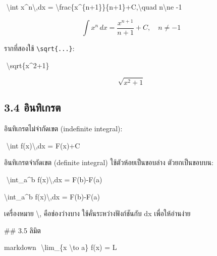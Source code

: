 \documentclass[
  thai,
  12pt,
  letterpaper,
  DIV=11,
  numbers=noendperiod]{scrartcl}
\newenvironment{Shaded}{\begin{snugshade}}{\end{snugshade}}
\newcommand{\FunctionTok}[1]{\textcolor[rgb]{0.28,0.35,0.67}{#1}}
\newcommand{\InformationTok}[1]{\textcolor[rgb]{0.37,0.37,0.37}{#1}}
\newcommand{\NormalTok}[1]{\textcolor[rgb]{0.00,0.23,0.31}{#1}}
\begin{document}
\begin{Shaded}
\begin{Highlighting}[]
\NormalTok{$$}
\NormalTok{\textbackslash{}int x\^{}n\textbackslash{},dx = \textbackslash{}frac\{x\^{}\{n+1\}\}\{n+1\}+C,\textbackslash{}quad n\textbackslash{}ne {-}1}
\NormalTok{$$}
\end{Highlighting}
\end{Shaded}

\[
\int x^n\,dx = \frac{x^{n+1}}{n+1}+C,\quad n\ne -1
\]

รากที่สองใช้ \texttt{\textbackslash{}sqrt\{...\}}:

\begin{Shaded}
\begin{Highlighting}[]
\NormalTok{$$}
\NormalTok{\textbackslash{}sqrt\{x\^{}2+1\}}
\NormalTok{$$}
\end{Highlighting}
\end{Shaded}

\[
\sqrt{x^2+1}
\]

\subsection{3.4 อินทิเกรต}\label{uxe2duxe19uxe17uxe40uxe01uxe23uxe15}

อินทิเกรตไม่จำกัดเขต (indefinite integral):

\begin{Shaded}
\begin{Highlighting}[]
\NormalTok{$$}
\NormalTok{\textbackslash{}int f(x)\textbackslash{},dx = F(x)+C}
\NormalTok{$$}
\end{Highlighting}
\end{Shaded}

อินทิเกรตจำกัดเขต (definite integral) ใช้ตัวห้อยเป็นขอบล่าง ตัวยกเป็นขอบบน:

\begin{Shaded}
\begin{Highlighting}[]
\NormalTok{$$}
\NormalTok{\textbackslash{}int\_a\^{}b f(x)\textbackslash{},dx = F(b){-}F(a)}
\NormalTok{$$}
\NormalTok{$$}

\NormalTok{\textbackslash{}int\_a\^{}b f(x)\textbackslash{},dx = F(b){-}F(a)}
\NormalTok{$$}

\NormalTok{เครื่องหมาย }\InformationTok{\textasciigrave{}\textbackslash{},\textasciigrave{}}\NormalTok{ คือช่องว่างบาง ใช้คั่นระหว่างฟังก์ชันกับ }\InformationTok{\textasciigrave{}dx\textasciigrave{}}\NormalTok{ เพื่อให้อ่านง่าย}

\FunctionTok{\#\# 3.5 ลิมิต}

\InformationTok{\textasciigrave{}\textasciigrave{}\textasciigrave{}markdown}
\NormalTok{$$}
\NormalTok{\textbackslash{}lim\_\{x \textbackslash{}to a\} f(x) = L}
\NormalTok{$$}
\end{Highlighting}
\end{Shaded}
\end{document}
